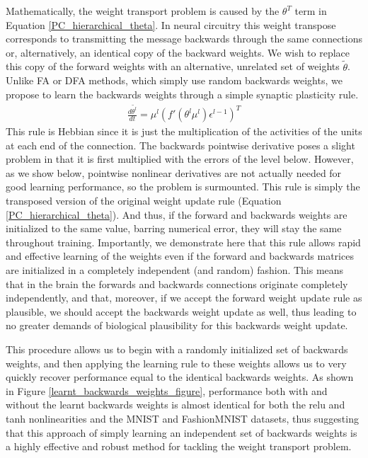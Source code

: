 Mathematically, the weight transport problem is caused by the $\theta^T$ term in Equation \ref{PC_hierarchical_theta}. In neural circuitry this weight transpose corresponds to transmitting the message backwards through the same connections or, alternatively, an identical copy of the backward weights. We wish to replace this copy of the forward weights with an alternative, unrelated set of weights $\tilde{\theta}$. Unlike FA or DFA methods, which simply use random backwards weights, we propose to learn the backwards weights through a simple synaptic plasticity rule. 
\begin{align*}
 \frac{d\tilde{\theta^l}}{dt} = \mu^l (f'(\theta^l \mu^l) \epsilon^{l-1})^T
\end{align*}
This rule is Hebbian since it is just the multiplication of the activities of the units at each end of the connection. The backwards pointwise derivative poses a slight problem in that it is first multiplied with the errors of the level below. However, as we show below, pointwise nonlinear derivatives are not actually needed for good learning performance, so the problem is surmounted. This rule is simply the transposed version of the original weight update rule (Equation \ref{PC_hierarchical_theta}). And thus, if the forward and backwards weights are initialized to the same value, barring numerical error, they will stay the same throughout training. Importantly, we demonstrate here that this rule allows rapid and effective learning of the weights even if the forward and backwards matrices are initialized in a completely independent (and random) fashion. This means that in the brain the forwards and backwards connections originate completely independently, and that, moreover, if we accept the forward weight update rule as plausible, we should accept the backwards weight update as well, thus leading to no greater demands of biological plausibility for this backwards weight update.

This procedure allows us to begin with a randomly initialized set of backwards weights, and then applying the learning rule to these weights allows us to very quickly recover performance equal to the identical backwards weights. As shown in Figure \ref{learnt_backwards_weights_figure}, performance both with and without the learnt backwards weights is almost identical for both the relu and tanh nonlinearities and the MNIST and FashionMNIST datasets, thus suggesting that this approach of simply learning an independent set of backwards weights is a highly effective and robust method for tackling the weight transport problem.

